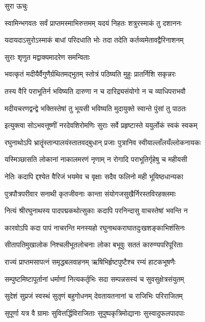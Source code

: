 सुरा ऊचुः

\twolineshloka
{स्वामिन्भगवतः सर्वं प्राप्तमस्माभिरुत्तमम्}
{यदयं निहतः शत्रुरस्माकं तु दशाननः}%

\twolineshloka
{यदायदाऽसुरोऽस्माकं बाधां परिदधाति भोः}
{तदा तदेति कर्तव्यमेतावद्वैरिनाशनम्}%



\onelineshloka
{सुराः शृणुत मद्वाक्यमादरेण समन्विताः}%

\twolineshloka
{भवत्कृतं मदीयैर्वैगुणैर्ग्रथितमद्भुतम्}
{स्तोत्रं पठिष्यति मुहुः प्रातर्निशि सकृन्नरः}%

\twolineshloka
{तस्य वैरि पराभूतिर्न भविष्यति दारुणा}
{न च दारिद्र्यसंयोगो न च व्याधिपराभवौ}%

\twolineshloka
{मदीयचरणद्वन्द्वे भक्तिस्तेषां तु भूयसी}
{भविष्यति मुदायुक्ते स्वान्ते पुंसां तु पाठतः}%

\twolineshloka
{इत्युक्त्वा सोऽभवत्तूष्णीं नरदेवशिरोमणिः}
{सुराः सर्वे प्रहृष्टास्ते ययुर्लोकं स्वकं स्वकम्}%

\twolineshloka
{रघुनाथोऽपि भ्रातॄंस्तान्पालयंस्तातवद्बुधान्}
{प्रजाः पुत्रानिव स्वीयाल्लाँलयँल्लोकनायकः}%

\twolineshloka
{यस्मिञ्छासति लोकानां नाकालमरणं नृणाम्}
{न रोगादि पराभूतिर्गृहेषु च महीयसी}%

\twolineshloka
{नेतिः कदापि द्दश्येत वैरिजं भयमेव च}
{वृक्षाः सदैव फलिनो मही भूयिष्ठधान्यका}%

\twolineshloka
{पुत्रपौत्रपरीवार सनाथी कृतजीवनाः}
{कान्ता संयोगजसुखैर्निरस्तविरहक्लमाः}%

\twolineshloka
{नित्यं श्रीरघुनाथस्य पादपद्मकथोत्सुकाः}
{कदापि परनिन्दासु वाचस्तेषां भवन्ति न}%

\twolineshloka
{कारवोऽपि कदा पापं नाचरन्ति मनस्यहो}
{रघुनाथकराघातदुःखशङ्काभिशंसिनः}%

\twolineshloka
{सीतापतिमुखालोक निश्चलीभूतलोचनाः}
{लोका बभूवुः सततं कारुण्यपरिपूरिताः}%

\twolineshloka
{राज्यं प्राप्तमसापत्नं समृद्धबलवाहनम्}
{ऋषिभिर्हृष्टपुष्टैश्च रम्यं हाटकभूषणैः}%

\twolineshloka
{सम्पुष्टमिष्टापूर्तानां धर्माणां नित्यकर्तृभिः}
{सदा सम्पन्नसस्यं च सुवसुक्षेत्रसंयुतम्}%

\twolineshloka
{सुदेशं सुप्रजं स्वस्थं सुतृणं बहुगोधनम्}
{देवतायतनानां च राजिभिः परिराजितम्}%

\twolineshloka
{सुपूर्णा यत्र वै ग्रामाः सुवित्तर्द्धिविराजिताः}
{सुपुष्पकृत्रिमोद्यानाः सुस्वादुफलपादपाः}%

